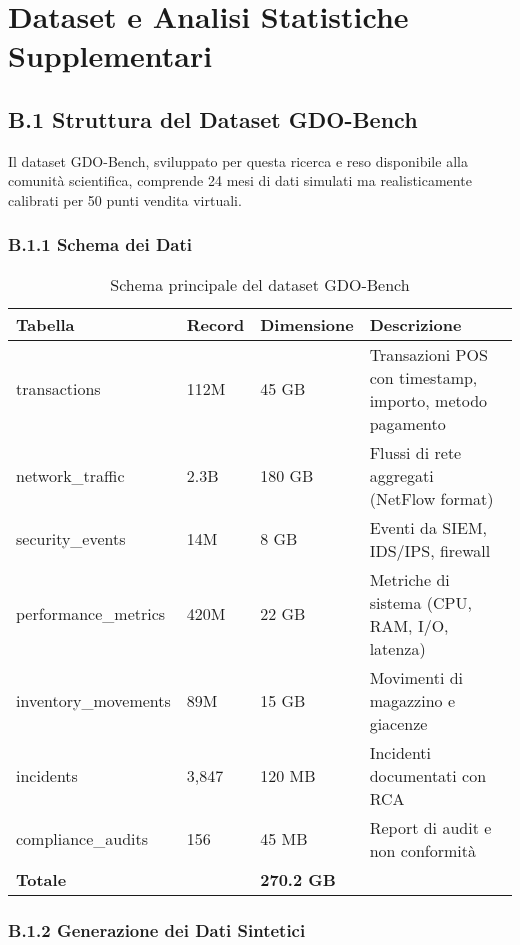 \chapter{Dataset e Analisi Statistiche Supplementari}
\label{app:dataset}

\section{B.1 Struttura del Dataset GDO-Bench}

Il dataset GDO-Bench, sviluppato per questa ricerca e reso disponibile alla comunità scientifica, comprende 24 mesi di dati simulati ma realisticamente calibrati per 50 punti vendita virtuali.

\subsection{B.1.1 Schema dei Dati}

\begin{table}[htbp]
\centering
\caption{Schema principale del dataset GDO-Bench}
\begin{tabular}{|l|l|l|p{5cm}|}
\hline
\textbf{Tabella} & \textbf{Record} & \textbf{Dimensione} & \textbf{Descrizione} \\
\hline
transactions & 112M & 45 GB & Transazioni POS con timestamp, importo, metodo pagamento \\
network\_traffic & 2.3B & 180 GB & Flussi di rete aggregati (NetFlow format) \\
security\_events & 14M & 8 GB & Eventi da SIEM, IDS/IPS, firewall \\
performance\_metrics & 420M & 22 GB & Metriche di sistema (CPU, RAM, I/O, latenza) \\
inventory\_movements & 89M & 15 GB & Movimenti di magazzino e giacenze \\
incidents & 3,847 & 120 MB & Incidenti documentati con RCA \\
compliance\_audits & 156 & 45 MB & Report di audit e non conformità \\
\hline
\textbf{Totale} & & \textbf{270.2 GB} & \\
\hline
\end{tabular}
\end{table}

\subsection{B.1.2 Generazione dei Dati Sintetici}

